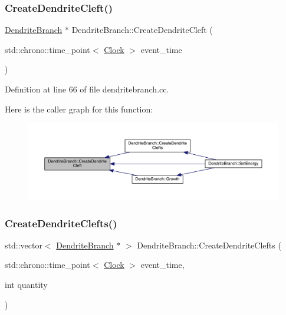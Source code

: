 \subsubsection{\texorpdfstring{Create\+Dendrite\+Cleft()}{CreateDendriteCleft()}}
{\footnotesize\ttfamily \hyperlink{class_dendrite_branch}{Dendrite\+Branch} $\ast$ Dendrite\+Branch\+::\+Create\+Dendrite\+Cleft (\begin{DoxyParamCaption}\item[{std\+::chrono\+::time\+\_\+point$<$ \hyperlink{universe_8h_a0ef8d951d1ca5ab3cfaf7ab4c7a6fd80}{Clock} $>$}]{event\+\_\+time }\end{DoxyParamCaption})}



Definition at line 66 of file dendritebranch.\+cc.

Here is the caller graph for this function\+:
\nopagebreak
\begin{figure}[H]
\begin{center}
\leavevmode
\includegraphics[width=350pt]{class_dendrite_branch_a4f751442a537f2e3d7d0dc66a09bd84b_icgraph}
\end{center}
\end{figure}
\mbox{\label{class_dendrite_branch_a86d00d6ad66c8c83683e9e22d73a71b6}} 
\subsubsection{\texorpdfstring{Create\+Dendrite\+Clefts()}{CreateDendriteClefts()}}
{\footnotesize\ttfamily std\+::vector$<$ \hyperlink{class_dendrite_branch}{Dendrite\+Branch} $\ast$ $>$ Dendrite\+Branch\+::\+Create\+Dendrite\+Clefts (\begin{DoxyParamCaption}\item[{std\+::chrono\+::time\+\_\+point$<$ \hyperlink{universe_8h_a0ef8d951d1ca5ab3cfaf7ab4c7a6fd80}{Clock} $>$}]{event\+\_\+time,  }\item[{int}]{quantity }\end{DoxyParamCaption})}



